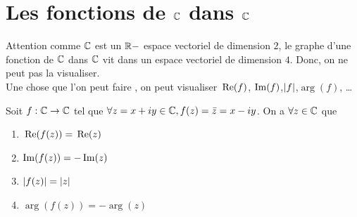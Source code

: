 \section{Les fonctions de $\mathbb{C}$ dans $\mathbb{C}$}
Attention comme $\mathbb{C}$ est un $\mathbb{R}-$ espace vectoriel de dimension $2$, le graphe d'une fonction de $\mathbb{C}$ dans $\mathbb{C}$ vit dans un espace vectoriel de dimension $4$. Donc, on ne peut pas la visualiser.\\
Une chose que l'on peut faire , on peut visualiser ${\,\operatorname{Re}}(f)$, $\operatorname{Im}(f)$,$\left| f \right|$,$\arg(f)$, \dots
\begin{exemple}
    Soit $f:\mathbb{C}\to\mathbb{C}$ tel que $\forall z=x+i y\in\mathbb{C}, f(z)=\bar{z}=x-i y$. On a $\forall z\in\mathbb{C}$ que \begin{enumerate}
        \item ${\,\operatorname{Re}}(f(z))={\,\operatorname{Re}}(z)$
        \item $\operatorname{Im}(f(z))=-\operatorname{Im}(z)$
        \item $\left| f(z) \right|=\left| z \right|$
        \item $\arg(f(z))=-\arg(z)$
    \end{enumerate}
\end{exemple}

